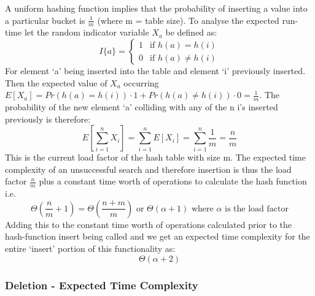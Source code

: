 \documentclass[11p]{article}
\begin{document}
A uniform hashing function implies that the probability of inserting a value into a particular bucket is $\frac{1}{m}$ (where m = table size). To analyse the expected run-time let the random indicator variable $X_a$ be defined as:
\begin{equation*}
I\{a \}=
\begin{cases}
1 & \text{if } h(a) = h(i) \\
0 & \text{if } h(a) \ne h(i)
\end{cases}
\end{equation*}
For element `a' being inserted into the table and element `i' previously inserted. Then the expected value of $X_a$ occurring $E[X_a] = Pr(h(a) = h(i)) \cdot 1 + Pr(h(a) \ne h(i)) \cdot 0 = \frac{1}{m}$. The probability of the new element `a' colliding with any of the n i's inserted previously is therefore:
$$E[\sum_{i=1}^n X_i] = \sum_{i=1}^nE[ X_i] = \sum_{i=1}^n \frac{1}{m} = \frac{n}{m}$$
This is the current load factor of the hash table with size m. The expected time complexity of an unsuccessful search and therefore insertion is thus the load factor $\frac{n}{m}$ plus a constant time worth of operations to calculate the hash function i.e.
$$\Theta(\frac{n}{m} + 1) = \Theta({\frac{n + m}{m}}) \text{ or } \Theta(\alpha + 1)  \text{ where } \alpha \text{ is the load factor}$$
Adding this to the constant time worth of operations calculated prior to the hash-function insert being called and we get an expected time complexity for the entire `insert' portion of this functionality as:
$$\Theta(\alpha + 2)$$



\subsubsection{Deletion - Expected Time Complexity}
\end{document}
